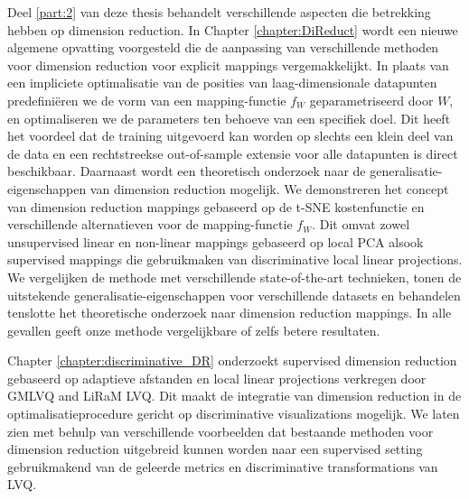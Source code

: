 \documentclass[10pt,fleqn]{phdthesis}%
\begin{document}
Deel \ref{part:2} van deze thesis behandelt verschillende aspecten die betrekking hebben op dimension reduction. In Chapter \ref{chapter:DiReduct} wordt een nieuwe algemene opvatting voorgesteld die de aanpassing van verschillende methoden voor dimension reduction voor explicit 
mappings vergemakkelijkt. 
In plaats van een impliciete optimalisatie van de posities van laag-dimensionale datapunten predefini\"eren we de vorm van 
een mapping-functie $f_W$ geparametriseerd door $W$, en optimaliseren we de parameters ten behoeve van een specifiek doel. 
Dit heeft het voordeel dat de training uitgevoerd kan worden op slechts een klein deel van de data en een rechtstreekse out-of-sample extensie 
voor alle datapunten is direct beschikbaar. 
Daarnaast wordt een theoretisch onderzoek naar de generalisatie-eigenschappen van dimension reduction mogelijk. 
We demonstreren het concept van dimension reduction mappings gebaseerd op de \acf{t-SNE} kostenfunctie en verschillende alternatieven voor 
de mapping-functie $f_W$. 
Dit omvat zowel unsupervised linear en non-linear mappings gebaseerd op local \acs{PCA} alsook supervised mappings die gebruikmaken van 
discriminative local linear projections. We vergelijken de methode met verschillende state-of-the-art technieken, tonen de uitstekende 
generalisatie-eigenschappen voor verschillende datasets en behandelen tenslotte het theoretische onderzoek naar dimension reduction mappings. 
In alle gevallen geeft onze methode vergelijkbare of zelfs betere resultaten.

Chapter \ref{chapter:discriminative_DR} onderzoekt supervised dimension reduction gebaseerd op adaptieve afstanden en local linear projections 
verkregen door \acs{GMLVQ} and \ac{LiRaM LVQ}. 
Dit maakt de integratie van dimension reduction in de optimalisatieprocedure gericht op discriminative visualizations mogelijk. 
We laten zien met behulp van verschillende voorbeelden dat bestaande methoden voor dimension reduction uitgebreid kunnen worden naar een 
supervised setting gebruikmakend van de geleerde metrics en discriminative transformations van \acs{LVQ}.
\end{document}

